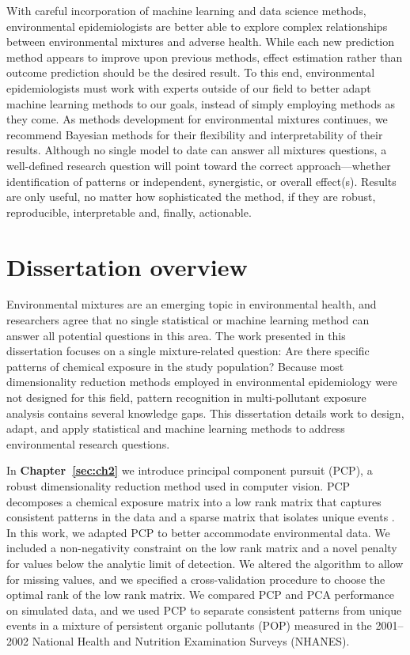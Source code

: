With careful incorporation of machine learning and data science methods, environmental epidemiologists are better able to explore complex relationships between environmental mixtures and adverse health. While each new prediction method appears to improve upon previous methods, effect estimation rather than outcome prediction should be the desired result. To this end, environmental epidemiologists must work with experts outside of our field to better adapt machine learning methods to our goals, instead of simply employing methods as they come. As methods development for environmental mixtures continues, we recommend Bayesian methods for their flexibility and interpretability of their results. Although no single model to date can answer all mixtures questions, a well-defined research question will point toward the correct approach---whether identification of patterns or independent, synergistic, or overall effect(s). Results are only useful, no matter how sophisticated the method, if they are robust, reproducible, interpretable and, finally, actionable.\footnotemark


\section{Dissertation overview}\label{sec:diss_over}

Environmental mixtures are an emerging topic in environmental health, and researchers agree that no single statistical or machine learning method can answer all potential questions in this area. The work presented in this dissertation focuses on a single mixture-related question: Are there specific patterns of chemical exposure in the study population? Because most dimensionality reduction methods employed in environmental epidemiology were not designed for this field, pattern recognition in  multi-pollutant exposure analysis contains several knowledge gaps. This dissertation details work to design, adapt, and apply statistical and machine learning methods to address environmental research questions.

In \textbf{Chapter~\ref{sec:ch2}} we introduce principal component pursuit (PCP), a robust dimensionality reduction method used in computer vision. PCP decomposes a chemical exposure matrix into a low rank matrix that captures consistent patterns in the data and a sparse matrix that isolates unique events \citep{candes2011robust,zhou2010stable}. In this work, we adapted PCP to better accommodate environmental data. We included a non-negativity constraint on the low rank matrix and a novel penalty for values below the analytic limit of detection. We altered the algorithm to allow for missing values, and we specified a cross-validation procedure to choose the optimal rank of the low rank matrix. We compared PCP and PCA performance on simulated data, and we used PCP to separate consistent patterns from unique events in a mixture of persistent organic pollutants (POP) measured in the 2001--2002 National Health and Nutrition Examination Surveys (NHANES).

